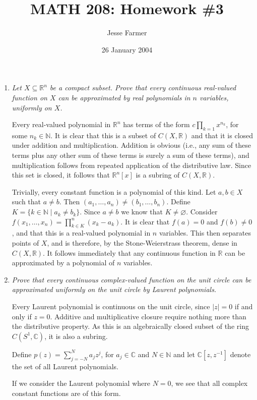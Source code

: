 \documentclass[11pt]{article}
\title{MATH 208: Homework \#3}
\author{Jesse Farmer}
\date{26 January 2004}
\begin{document}
\maketitle
\begin{enumerate}
\item \emph{Let $X \subseteq \mathbb{R}^n$ be a compact subset.  Prove that every continuous real-valued function on $X$ can be approximated by real polynomials in $n$ variables, uniformly on $X$.}

Every real-valued polynomial in $\mathbb{R}^n$ has terms of the form $c\prod_{k=1}x^{n_k}$, for some $n_k \in \mathbb{N}$.  It is clear that this is a subset of $C(X,\mathbb{R})$ and that it is closed under addition and multiplication.  Addition is obvious (i.e., any sum of these terms plus any other sum of these terms is surely a sum of these terms), and multiplication follows from repeated application of the distributive law.  Since this set is closed, it follows that $\mathbb{R}^n[x]$ is a subring of  $C(X,\mathbb{R})$.

Trivially, every constant function is a polynomial of this kind.  Let $a,b \in X$ such that $a \neq b$.  Then $(a_1,\ldots,a_n) \neq (b_1,\ldots,b_n)$.  Define $K = \{k \in \mathbb{N} \mid a_k \neq b_k\}$.  Since $a \neq b$ we know that $K \neq \varnothing$.  Consider $f(x_1,\ldots,x_n) = \prod_{k \in K}^n(x_k - a_k)$.  It is clear that $f(a)=0$ and $f(b) \neq 0$, and that this is a real-valued polynomial in $n$ variables.  This then separates points of $X$, and is therefore, by the Stone-Weierstrass theorem, dense in $C(X,\mathbb{R})$.  It follows immediately that any continuous function in $\mathbb{R}$ can be approximated by a polynomial of $n$ variables.

\item \emph{Prove that every continuous complex-valued function on the unit circle can be approximated uniformly on the unit circle by Laurent polynomials.}

Every Laurent polynomial is continuous on the unit circle, since $|z| = 0$ if and only if $z = 0$.  Additive and multiplicative closure require nothing more than the distributive property.  As this is an algebraically closed subset of the ring $C(S^1,\mathbb{C})$, it is also a subring.

Define $p(z) = \sum_{j=-N}^Na_jz^j$, for $a_j \in \mathbb{C}$ and $N \in \mathbb{N}$ and let $\mathbb{C}[z,z^{-1}]$ denote the set of all Laurent polynomials.

If we consider the Laurent polynomial where $N=0$, we see that all complex constant functions are of this form. 


\end{enumerate}
\end{document}
